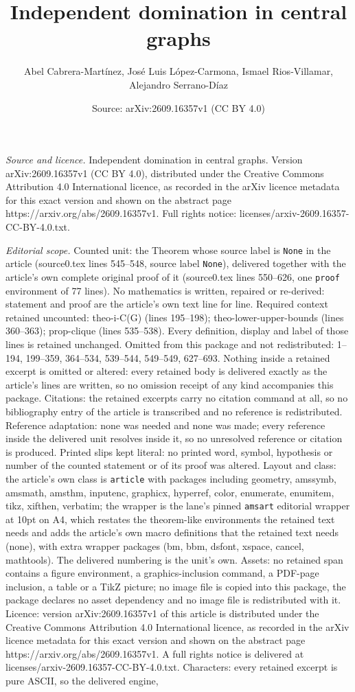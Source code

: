 \documentclass[10pt,a4paper]{amsart}
\title[Independent domination in central graphs]{Independent domination in central graphs}
\author{Abel Cabrera-Mart\'inez, Jos\'e Luis L\'opez-Carmona, Ismael Rios-Villamar, Alejandro Serrano-D\'iaz}
\date{Source: arXiv:2609.16357v1 (CC BY 4.0)}
\begin{document}
\maketitle

\noindent\emph{Source and licence.} Independent domination in central graphs. Version arXiv:2609.16357v1 (CC BY 4.0), distributed under the Creative Commons Attribution 4.0 International licence, as recorded in the arXiv licence metadata for this exact version and shown on the abstract page https://arxiv.org/abs/2609.16357v1. Full rights notice: licenses/arxiv-2609.16357-CC-BY-4.0.txt.\par\smallskip

\noindent\textit{Editorial scope.} Counted unit: the Theorem whose source label is \texttt{None} in the article (source0.tex lines 545--548, source label \texttt{None}), delivered together with the article's own complete original proof of it (source0.tex lines 550--626, one \texttt{proof} environment of 77 lines). No mathematics is written, repaired or re-derived: statement and proof are the article's own text line for line. Required context retained uncounted: theo-i-C(G) (lines 195--198); theo-lower-upper-bounds (lines 360--363); prop-clique (lines 535--538). Every definition, display and label of those lines is retained unchanged. Omitted from this package and not redistributed: 1--194, 199--359, 364--534, 539--544, 549--549, 627--693. Nothing inside a retained excerpt is omitted or altered: every retained body is delivered exactly as the article's lines are written, so no omission receipt of any kind accompanies this package. Citations: the retained excerpts carry no citation command at all, so no bibliography entry of the article is transcribed and no reference is redistributed. Reference adaptation: none was needed and none was made; every reference inside the delivered unit resolves inside it, so no unresolved reference or citation is produced. Printed slips kept literal: no printed word, symbol, hypothesis or number of the counted statement or of its proof was altered. Layout and class: the article's own class is \texttt{article} with packages including geometry, amssymb, amsmath, amsthm, inputenc, graphicx, hyperref, color, enumerate, enumitem, tikz, xifthen, verbatim; the wrapper is the lane's pinned \texttt{amsart} editorial wrapper at 10pt on A4, which restates the theorem-like environments the retained text needs and adds the article's own macro definitions that the retained text needs (none), with extra wrapper packages (bm, bbm, dsfont, xspace, cancel, mathtools). The delivered numbering is the unit's own. Assets: no retained span contains a figure environment, a graphics-inclusion command, a PDF-page inclusion, a table or a TikZ picture; no image file is copied into this package, the package declares no asset dependency and no image file is redistributed with it. Licence: version arXiv:2609.16357v1 of this article is distributed under the Creative Commons Attribution 4.0 International licence, as recorded in the arXiv licence metadata for this exact version and shown on the abstract page https://arxiv.org/abs/2609.16357v1. A full rights notice is delivered at licenses/arxiv-2609.16357-CC-BY-4.0.txt. Characters: every retained excerpt is pure ASCII, so the delivered engine, 
\end{document}
